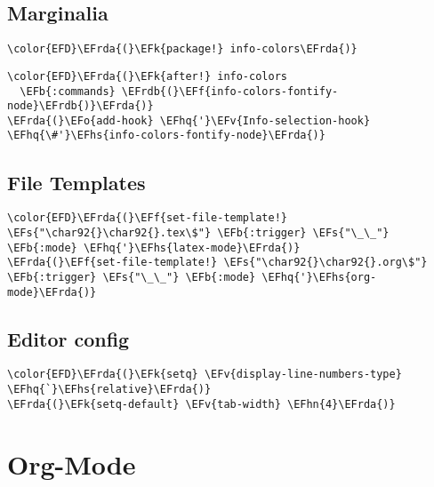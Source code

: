 \documentclass[12pt]{article}
\theoremstyle{plain}%
\theoremstyle{definition}
\theoremstyle{remark}
\newcommand{\EFs}[1]{\textcolor{EFs}{#1}} %
\newcommand{\EFk}[1]{\textcolor{EFk}{#1}} %
\newcommand{\EFb}[1]{\textcolor{EFb}{#1}} %
\newcommand{\EFf}[1]{\textcolor{EFf}{#1}} %
\newcommand{\EFv}[1]{\textcolor{EFv}{#1}} %
\newcommand{\EFo}[1]{\textcolor{EFo}{#1}} %
\newcommand{\EFhn}[1]{\textcolor{EFhn}{\textbf{#1}}} %
\newcommand{\EFhq}[1]{\textcolor{EFhq}{#1}} %
\newcommand{\EFhs}[1]{\textcolor{EFhs}{#1}} %
\newcommand{\EFrda}[1]{\textcolor{EFrda}{#1}} %
\newcommand{\EFrdb}[1]{\textcolor{EFrdb}{#1}} %
\begin{document}
\subsection{Marginalia}
\label{sec:orga45bf5b}
\begin{Code}
\begin{Verbatim}
\color{EFD}\EFrda{(}\EFk{package!} info-colors\EFrda{)}
\end{Verbatim}
\end{Code}
\begin{Code}
\begin{Verbatim}
\color{EFD}\EFrda{(}\EFk{after!} info-colors
  \EFb{:commands} \EFrdb{(}\EFf{info-colors-fontify-node}\EFrdb{)}\EFrda{)}
\EFrda{(}\EFo{add-hook} \EFhq{'}\EFv{Info-selection-hook} \EFhq{\#'}\EFhs{info-colors-fontify-node}\EFrda{)}
\end{Verbatim}
\end{Code}
\subsection{File Templates}
\label{sec:orgb147ae9}
\begin{Code}
\begin{Verbatim}
\color{EFD}\EFrda{(}\EFf{set-file-template!} \EFs{"\char92{}\char92{}.tex\$"} \EFb{:trigger} \EFs{"\_\_"} \EFb{:mode} \EFhq{'}\EFhs{latex-mode}\EFrda{)}
\EFrda{(}\EFf{set-file-template!} \EFs{"\char92{}\char92{}.org\$"} \EFb{:trigger} \EFs{"\_\_"} \EFb{:mode} \EFhq{'}\EFhs{org-mode}\EFrda{)}
\end{Verbatim}
\end{Code}
\subsection{Editor config}
\label{sec:orgf44e046}
\begin{Code}
\begin{Verbatim}
\color{EFD}\EFrda{(}\EFk{setq} \EFv{display-line-numbers-type} \EFhq{`}\EFhs{relative}\EFrda{)}
\EFrda{(}\EFk{setq-default} \EFv{tab-width} \EFhn{4}\EFrda{)}
\end{Verbatim}
\end{Code}
\section{Org-Mode}
\label{sec:org74d985e}
\end{document}
